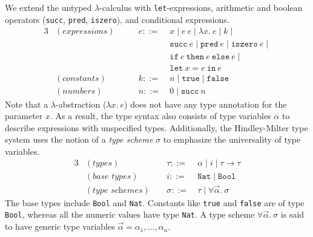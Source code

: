 We extend the untyped $\lambda$-calculus with \texttt{let}-expressions, 
arithmetic and boolean operators (\texttt{succ}, \texttt{pred}, \texttt{iszero}), 
and conditional expressions.
\begin{alignat*}{3}
    &(\textit{expressions}) \qquad 
    & e ::= \: & x \; | \;  
          e \: e \; | \;
          \lambda x. \: e \; | \;
          k \; | \; \\
    &&    & \texttt{succ} \: e \; | \;
          \texttt{pred} \: e \; | \;
          \texttt{iszero} \: e \; | \; \\
    &&    & \texttt{if} \: e \: \texttt{then} \: e \: \texttt{else} \: e \; | \; \\
    &&    & \texttt{let} \: x = e \: \texttt{in} \: e  \\
    &(\textit{constants}) 
    & k ::= \: & n \; | \; \texttt{true} \; | \; \texttt{false} \\
    &(\textit{numbers}) 
    & n ::= \: & 0 \; | \; \texttt{succ} \: n 
\end{alignat*}
Note that a $\lambda$-abstraction ($\lambda x. \: e$) does not have any type annotation 
for the parameter $x$. As a result, the type syntax also consists of type variables 
$\alpha$ to describe expressions with unspecified types. Additionally, the Hindley-Milter 
type system uses the notion of a \emph{type scheme} $\sigma$ to emphasize the 
universality of type variables.
\begin{alignat*}{3}
    &(\textit{types}) \hspace{2cm}
    & \tau ::= \: & \alpha \; | \;  
          i \; | \;
          \tau \rightarrow \tau \\
    &(\textit{base types}) 
    & i ::= \: & \texttt{Nat} \; | \; \texttt{Bool} \\
    &(\textit{type schemes}) 
    & \sigma ::= \: & \tau \; | \; \forall \overrightarrow{\alpha}. \: \sigma 
\end{alignat*}
The base types include \texttt{Bool} and \texttt{Nat}. Constants like \texttt{true} 
and \texttt{false} are of type \texttt{Bool}, whereas all the numeric values have 
type \texttt{Nat}. A type scheme $\forall \overrightarrow{\alpha}. \: \sigma$ is said 
to have generic type variables $\overrightarrow{\alpha} = \alpha _1,...,\alpha _n$.
